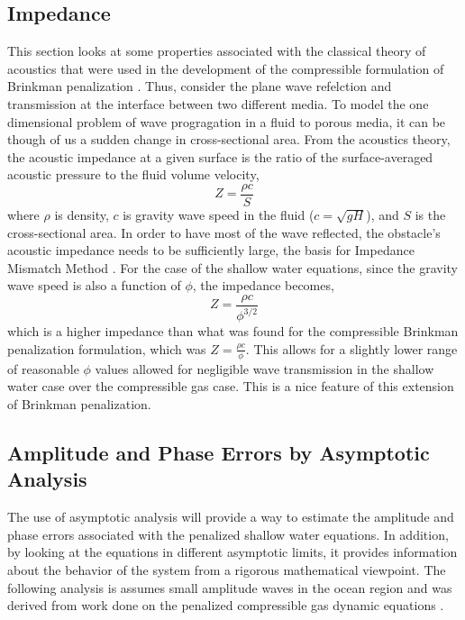 \subsection{Impedance}

This section looks at some properties associated with the classical theory of acoustics \cite{00Blackstock} that were used in the development of the compressible formulation of Brinkman penalization \cite{06LV}.  Thus, consider the plane wave refelction and transmission at the interface between two different media.  To model the one dimensional problem of wave progragation in a fluid to porous media, it can be though of us a sudden change in cross-sectional area.  From the acoustics theory, the acoustic impedance at a given surface is the ratio of the surface-averaged acoustic pressure to the fluid volume velocity,  
%
\begin{equation*}
Z=\frac{\rho c}{S}
\end{equation*}
%
where $\rho$ is density, $c$ is gravity wave speed in the fluid ($c=\sqrt{gH}$), and $S$ is the cross-sectional area.  In order to have most of the wave reflected, the obstacle's acoustic impedance needs to be sufficiently large, the basis for Impedance Mismatch Method \cite{95Chung}.  For the case of the shallow water equations, since the gravity wave speed is also a function of $\phi$, the impedance becomes, 
%
\begin{equation*}
Z=\frac{\rho c}{\phi ^{3/2}}
\end{equation*}
%
which is a higher impedance than what was found for the compressible Brinkman penalization formulation, which was $Z=\frac{\rho c}{\phi}$.  This allows for a slightly lower range of reasonable $\phi$ values allowed for negligible wave transmission in the shallow water case over the compressible gas case.    This is a nice feature of this extension of Brinkman penalization.  

\subsection{Amplitude and Phase Errors by Asymptotic Analysis}

The use of asymptotic analysis will provide a way to estimate the amplitude and phase errors associated with the penalized shallow water equations.  In addition, by looking at the equations in different asymptotic limits, it provides information about the behavior of the system from a rigorous mathematical viewpoint.  The following analysis is assumes small amplitude waves in the ocean region and was derived from work done on the penalized compressible gas dynamic equations \cite{06LV}.  

